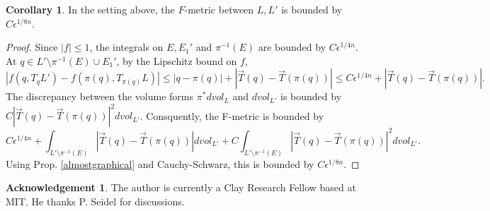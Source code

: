 \documentclass[a4paper]{article}
\theoremstyle{definition}
\newtheorem{cor}[thm]{Corollary}
\newtheorem*{Acknowledgement}{Acknowledgement}
\begin{document}
\begin{cor}
In the setting above, the $F$-metric between $L, L'$ is bounded by $C\epsilon^{1/8n}$. 
\end{cor}




\begin{proof}
Since $|f|\leq 1$, the integrals on $E, E_1'$ and $\pi^{-1}(E)$ are bounded by $C\epsilon^{1/4n}$. At $q\in L'\setminus \pi^{-1}(E)\cup E_1'$, by the Lipschitz bound on $f$,
\[
|f(q, T_q L')- f(\pi(q), T_{\pi(q)}L)| \leq |q-\pi(q)|+ |\vec{T}(q)- \vec{T}(\pi(q))| \leq C\epsilon^{1/4n}+ |\vec{T}(q)- \vec{T}(\pi(q))|.
\]
The discrepancy between the volume forms $\pi^*dvol_L$ and $dvol_{L'}$ is bounded by $C |\vec{T}(q)- \vec{T}(\pi(q))|^2 dvol_{L'}$. Consquently, the F-metric is bounded by
\[
C\epsilon^{1/4n}+ \int_{L'\setminus \pi^{-1}(E)} |\vec{T}(q)- \vec{T}(\pi(q))| dvol_{L'} + C\int_{L'\setminus \pi^{-1}(E)} |\vec{T}(q)- \vec{T}(\pi(q))|^2 dvol_{L'}.
\]
Using Prop. \ref{almostgraphical} and Cauchy-Schwarz, this is bounded by $C\epsilon^{1/8n}$.
\end{proof}













\begin{Acknowledgement}
The author is currently a Clay Research Fellow based at MIT. He thanks P. Seidel for discussions.	
\end{Acknowledgement}
\end{document}
